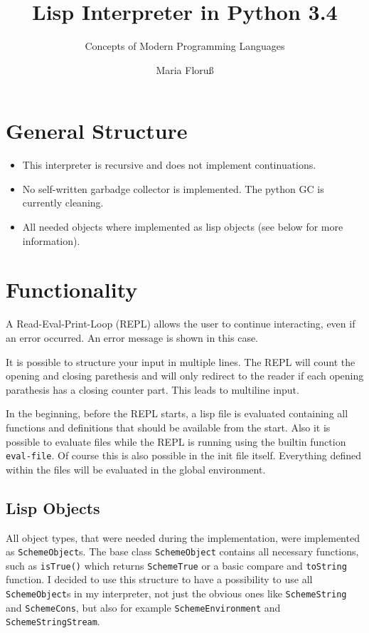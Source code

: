\documentclass[12pt,a4paper]{scrartcl}
\begin{document}
\title{Lisp Interpreter in Python 3.4}
\subtitle{Concepts of Modern Programming Languages}
\author{Maria Floru\ss}
\maketitle
\newpage

\section{General Structure}
\begin{itemize}
\item This interpreter is recursive and does not implement continuations. 
\item No self-written garbadge collector is implemented. The python GC is currently cleaning.
\item All needed objects where implemented as lisp objects (see below for more information).
\end{itemize}

\section{Functionality}
A Read-Eval-Print-Loop (REPL) allows the user to continue interacting, even if an error occurred. An error message is shown in this case.

It is possible to structure your input in multiple lines. The REPL will count the opening and closing parethesis and will only redirect to the reader if each opening parathesis has a closing counter part. This leads to multiline input.

In the beginning, before the REPL starts, a lisp file is evaluated containing all functions and definitions that should be available from the start. Also it is possible to evaluate files while the REPL is running using the builtin function \lstinline{eval-file}. Of course this is also possible in the init file itself. Everything defined within the files will be evaluated in the global environment.

\subsection{Lisp Objects}
All object types, that were needed during the implementation, were implemented as \lstinline{SchemeObject}s. The base class \lstinline{SchemeObject} contains all necessary functions, such as \lstinline{isTrue()} which returns \lstinline{SchemeTrue} or a basic compare and \lstinline{toString} function. I decided to use this structure to have a possibility to use all \lstinline{SchemeObject}s in my interpreter, not just the obvious ones like \lstinline{SchemeString} and \lstinline{SchemeCons}, but also for example \lstinline{SchemeEnvironment} and \lstinline{SchemeStringStream}. 
\end{document}
